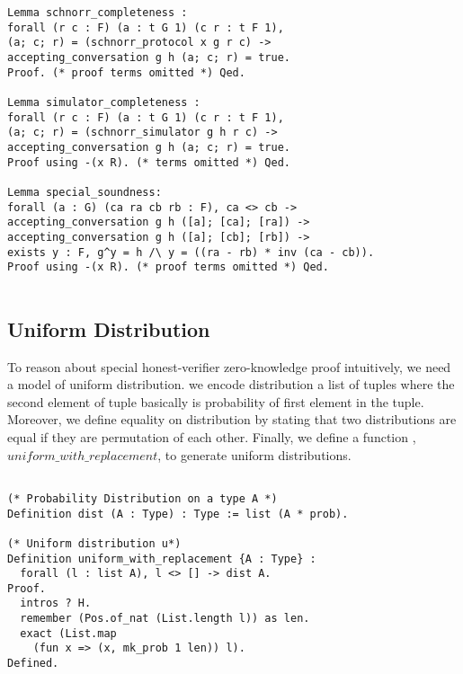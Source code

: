 \documentclass[conference,compsoc]{IEEEtran}
\begin{document}
\begin{lstlisting}[frame=single, language=Coq, caption={Completeness and Soundness},
  label={comp_sound},captionpos=t, basicstyle=\ttfamily\footnotesize,
  abovecaptionskip=-\medskipamount]
Lemma schnorr_completeness : 
forall (r c : F) (a : t G 1) (c r : t F 1),
(a; c; r) = (schnorr_protocol x g r c) ->
accepting_conversation g h (a; c; r) = true.
Proof. (* proof terms omitted *) Qed.
  
Lemma simulator_completeness : 
forall (r c : F) (a : t G 1) (c r : t F 1),
(a; c; r) = (schnorr_simulator g h r c) ->
accepting_conversation g h (a; c; r) = true.
Proof using -(x R). (* terms omitted *) Qed. 
  
Lemma special_soundness: 
forall (a : G) (ca ra cb rb : F), ca <> cb ->
accepting_conversation g h ([a]; [ca]; [ra]) ->  
accepting_conversation g h ([a]; [cb]; [rb]) ->
exists y : F, g^y = h /\ y = ((ra - rb) * inv (ca - cb)).
Proof using -(x R). (* proof terms omitted *) Qed.
  
\end{lstlisting}
 





  
  \subsection{Uniform Distribution}
  To reason about special honest-verifier zero-knowledge proof 
  intuitively, we need a model of uniform distribution. 
  we encode distribution a list of tuples where the 
  second element of tuple basically is probability of first element 
  in the tuple. Moreover, we define equality on distribution by 
  stating that two distributions are equal if they are permutation 
  of each other. Finally, we define a function , $uniform\_with\_replacement$, 
  to generate uniform distributions. 

\begin{lstlisting}[frame=single, language=Coq, caption={Definition of Natural Number},
    label={ind_nat},captionpos=t, basicstyle=\ttfamily\footnotesize,
    abovecaptionskip=-\medskipamount]
    
(* Probability Distribution on a type A *)
Definition dist (A : Type) : Type := list (A * prob).
  
(* Uniform distribution u*)
Definition uniform_with_replacement {A : Type} : 
  forall (l : list A), l <> [] -> dist A.
Proof.
  intros ? H.
  remember (Pos.of_nat (List.length l)) as len.
  exact (List.map 
    (fun x => (x, mk_prob 1 len)) l).
Defined.
\end{lstlisting}
\end{document}
